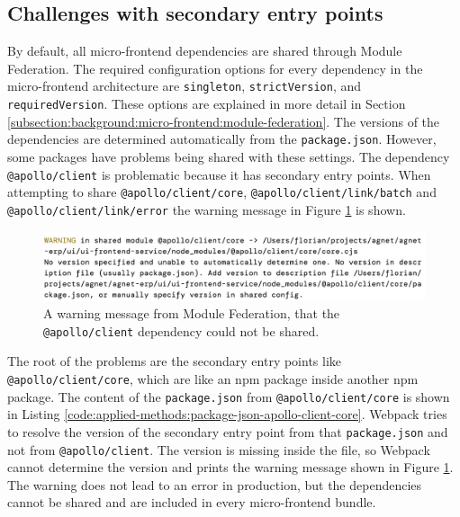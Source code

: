 \subsection{Challenges with secondary entry points}\label{subsection:applied-methods:prototypical-implementation:sharing
-secondary-entrypoints}

By default, all micro-frontend dependencies are shared through Module Federation. The required configuration options for every dependency in the micro-frontend architecture are \texttt{singleton}, \texttt{strictVersion}, and \texttt{requiredVersion}. These options are explained in more detail in Section \ref{subsection:background:micro-frontend:module-federation}. The versions of the dependencies are determined automatically from the \texttt{package.json}. However, some packages have problems being shared with these settings. The dependency \texttt{@apollo/client} is problematic because it has secondary entry points. When attempting to share \texttt{@apollo/client/core}, \texttt{@apollo/client/link/batch} and \texttt{@apollo/client/link/error} the warning message in Figure \ref{fig:applied-methods:sharing-secondary-entrypoints-error} is shown.

\ifshowImages
  \begin{figure}[H]
  \centering
  \includegraphics[width=1\linewidth]{images/applied-methods/prototypical-implementation/module-federation-apollo-warning.jpg}
  \caption{A warning message from Module Federation, that the \texttt{@apollo/client} dependency could not be shared.}\label{fig:applied-methods:sharing-secondary-entrypoints-error}
  \end{figure}
\fi

\noindent The root of the problems are the secondary entry points like \texttt{@apollo/client/core}, which are like an npm package inside another npm package. The content of the \texttt{package.json} from \texttt{@apollo/client/core} is shown in Listing \ref{code:applied-methods:package-json-apollo-client-core}. Webpack tries to resolve the version of the secondary entry point from that \texttt{package.json} and not from \texttt{@apollo/client}. The version is missing inside the file, so Webpack cannot determine the version and prints the warning message shown in Figure \ref{fig:applied-methods:sharing-secondary-entrypoints-error}. The warning does not lead to an error in production, but the dependencies cannot be shared and are included in every micro-frontend bundle.


